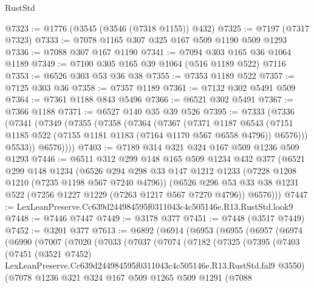 \begin{lexlean}{RustStd}
\begin{coremodule}
@7323 := @1776 (@3545 (@3546 (@7318 @1155)) @432)
@7325 := @7197 (@7317 @7323)
@7333 := @7078 @1165 @307 @325 @167 @509 @1190 @509 @1293
@7336 := @7088 @307 @167 @1190
@7341 := @7094 @303 @165 @36 @1064 @1189
@7349 := @7100 @305 @165 @39 @1064 (@516 @1189 @522) @7116
@7353 := @6526 @303 @53 @36 @38
@7355 := @7353 @1189 @522
@7357 := @7125 @303 @36
@7358 := @7357 @1189
@7361 := @7132 @302 @5491 @509
@7364 := @7361 @1188 @843 @5496
@7366 := @6521 @302 @5491
@7367 := @7366 @1188
@7371 := @6527 @140 @35 @39 @526
@7395 := @7333
    (@7336
      (@7341
        (@7349
          (@7355
            (@7358
              (@7364
                (@7367
                  (@7371
                    @1187
                    @6543
                    (@7151 @1185 @522 (@7155 @1181 @1183 (@7164 @1170 @567 @6558 @4796)) @6576)))
                @5533))
            @6576))))
@7403 := @7189 @314 @321 @324 @167 @509 @1236 @509 @1293
@7446 := @6511
    @312
    @299
    @148
    @165
    @509
    @1234
    @432
    @377
    (@6521
      @299
      @148
      @1234
      (@6526
        @294
        @298
        @33
        @147
        @1212
        @1233
        (@7228 @1208 @1210 (@7235 @1198 @567 @7240 @4796))
        (@6526
          @296
          @53
          @33
          @38
          @1231
          @522
          (@7256 @1227 @1229 (@7263 @1217 @567 @7270 @4796))
          @6576)))
@7447 := LexLeanPreserve.Cc639d244984595f0311043c4c505146e.R13.RustStd.look9
@7448 := @7446 @7447
@7449 := @3178 @377
@7451 := @7448 (@3517 @7449)
@7452 := @3201 @377
@7613 := @6892
    (@6914
      (@6953
        (@6955
          (@6957
            (@6974
              (@6990
                (@7007
                  (@7020
                    (@7033
                      (@7037
                        (@7074
                          (@7182
                            (@7325
                              (@7395
                                (@7403
                                  (@7451
                                    (@3521 @7452)
                                    LexLeanPreserve.Cc639d244984595f0311043c4c505146e.R13.RustStd.fal9
                                    @3550)
                                  (@7078
                                    @1236
                                    @321
                                    @324
                                    @167
                                    @509
                                    @1265
                                    @509
                                    @1291
                                    (@7088

\end{coremodule}
\end{lexlean}
